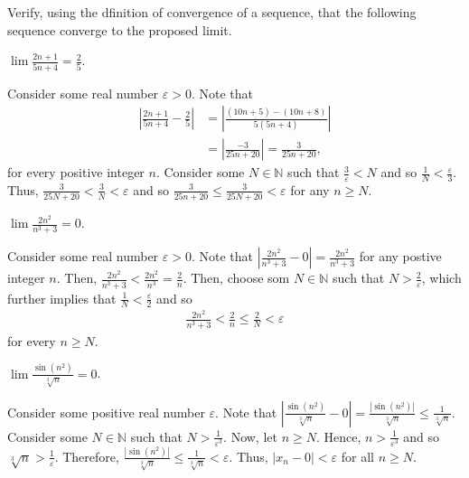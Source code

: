 \documentclass[12pt]{article}
\newcommand{\N}{\mathbb{N}}
\newcommand{\Abs}[1]{\left\vert #1 \right\vert}
\newenvironment{problem}[2][Problem]{\begin{trivlist} \item[\hskip \labelsep {\bfseries #1}\hskip \labelsep {\bfseries #2.}]}{\end{trivlist}}
\newenvironment{solution}[1][Solution]{\begin{trivlist} \item[\hskip \labelsep {\bfseries #1}]}{\end{trivlist}}
\begin{document}
    \begin{problem}{2.2.2}
      Verify, using the dfinition of convergence of a sequence, that the following sequence converge to the proposed limit.
      \begin{enumerate}[label=(\alph*)]
	\item $\lim \frac{2n+1}{5n+4}=\frac{2}{5}$.
    \begin{solution}
     Consider some real number $\varepsilon>0$. Note that
    \begin{align*}
      \left\vert\frac{2n+1}{5n+4}-\frac{2}{5}\right\vert &= \left\vert\frac{(10n+5)-(10n+8)}{5(5n+4)}\right\vert\\
      &= \left\vert\frac{-3}{25n+20}\right\vert = \frac{3}{25n+20},
    \end{align*}
    for every positive integer $n$. Consider some $N\in \N$ such that $\frac{3}{\varepsilon}<N$ and so $\frac{1}{N} < \frac{\varepsilon}{3}$. Thus, $\frac{3}{25N+20}<\frac{3}{N} <\varepsilon$ and so $\frac{3}{25n+20}\leq \frac{3}{25N+20} <\varepsilon$ for any $n\geq N$.
    \end{solution}
	\item $\lim \frac{2n^{2}}{n^{3}+3}=0$.
    \begin{solution}
      Consider some real number $\varepsilon>0$. Note that $\Abs{\frac{2n^{2}}{n^{3}+3} - 0} = \frac{2n^{2}}{n^{3}+3}$ for any postive integer $n$. Then, $\frac{2n^{2}}{n^{3}+3} < \frac{2n^{2}}{n^{3}} = \frac{2}{n}$. Then, choose som $N\in \N$ such that $N>\frac{2}{\varepsilon}$, which further implies that $\frac{1}{N}<\frac{\varepsilon}{2}$ and so 
    \begin{align*}
      \frac{2n^{2}}{n^{3}+3} < \frac{2}{n}\leq \frac{2}{N}<\varepsilon
    \end{align*}
    for every $n\geq N$.
    \end{solution}
	\item $\lim \frac{\sin(n^{2})}{\sqrt[3]{n}}=0$.
	  \begin{solution}
	    Consider some positive real number $\varepsilon$. Note that $\Abs{\frac{\sin(n^{2})}{\sqrt[3]{n}}-0} = \frac{\Abs{\sin(n^{2})}}{\sqrt[3]{n}}\leq \frac{1}{\sqrt[3]{n}}$. Consider some $N\in \N$ such that $N>\frac{1}{\varepsilon^{3}}$. Now, let $n\geq N$. Hence, $n>\frac{1}{\varepsilon^{3}}$ and so $\sqrt[3]{n}>\frac{1}{\varepsilon}$. Therefore, $\frac{\Abs{\sin(n^{2})}}{\sqrt[3]{n}}\leq \frac{1}{\sqrt[3]{n}}< \varepsilon$. Thus, $|x_{n}-0|<\varepsilon$ for all $n\geq N$.
    \end{solution}
    \end{enumerate}
    \end{problem}
\end{document}
